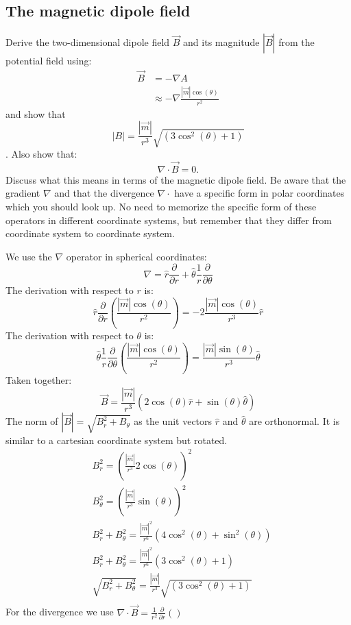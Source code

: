 \subsection{The magnetic dipole field}
\label{Sec:DipoleField}
Derive the two-dimensional dipole field $\vec{B}$ and its magnitude $|\vec{B}|$ from the potential field using:
\begin{align*}
    \vec{B} & = -\nabla A \\
       &\approx -\nabla \frac{|\vec{m}|\cos(\theta)}{r^2}
\end{align*}
and show that 
$$
    |B| = \frac{|\vec{m}|}{r^3}\sqrt{\left(3\cos^2(\theta) + 1\right)}
$$. 
Also show that: 
$$
    \nabla \cdot \vec{B} = 0.
$$
Discuss what this means in terms of the magnetic dipole field. Be aware that the gradient $\nabla$ and that the divergence $\nabla \cdot$ have a specific form in polar coordinates which you should look up. No need to memorize the specific form of these operators in different coordinate systems, but remember that they differ from coordinate system to coordinate system.


\ifanswers
    \begin{tcolorbox}[enhanced jigsaw,breakable,pad at break*=1mm,
    colback=blue!5!white,colframe=babyblueeyes,title=Solutions]
    We use the $\nabla$ operator in spherical coordinates:
    $$
        \nabla = \hat{r}\frac{\partial}{\partial r} + \hat{\theta} \frac{1}{r}\frac{\partial}{\partial \theta}
    $$
    The derivation with respect to $r$ is:
    $$ 
        \hat{r}\frac{\partial}{\partial r} \left(\frac{|\vec{m}|\cos(\theta)}{r^2}\right) = -2\frac{|\vec{m}|\cos(\theta)}{r^3}\hat{r}
    $$
    The derivation with respect to $\theta$ is:
    $$
    \hat{\theta} \frac{1}{r}\frac{\partial}{\partial \theta}\left(\frac{|\vec{m}|\cos(\theta)}{r^2}\right) = \frac{|\vec{m}|\sin(\theta)}{r^3}\hat{\theta}
    $$
    Taken together:
    $$
        \vec{B} = \frac{|\vec{m}|}{r^3}\left(2\cos(\theta)\hat{r} + \sin(\theta)\hat{\theta} \right)
    $$
    The norm of $|\vec{B}| = \sqrt{B_r^2 + B_{\theta}}$ as the unit vectors $\hat{r}$ and $\hat{\theta}$ are orthonormal. It is similar to a cartesian coordinate system but rotated.
    \begin{align*}
        &B_r^2 = \left(\frac{|\vec{m}|}{r^3}2\cos(\theta)\right)^2 \\ 
        &B_{\theta}^2 = \left(\frac{|\vec{m}|}{r^3} \sin(\theta) \right)^2 \\
        &B_r^2+ B_{\theta}^2 = \frac{|\vec{m}|^2}{r^6}\left(4\cos^2(\theta) + \sin^2(\theta)\right) \\
        &B_r^2+ B_{\theta}^2 = \frac{|\vec{m}|^2}{r^6}\left(3\cos^2(\theta) + 1\right) \\ 
        &\sqrt{B_r^2+ B_{\theta}^2} = \frac{|\vec{m}|}{r^3}\sqrt{\left(3\cos^2(\theta) + 1\right)} \\
    \end{align*}
    For the divergence we use $\nabla \cdot \vec{B} = \frac{1}{r^2}\frac{\partial}{\partial r}\left( \right)$
    \end{tcolorbox}
\fi
